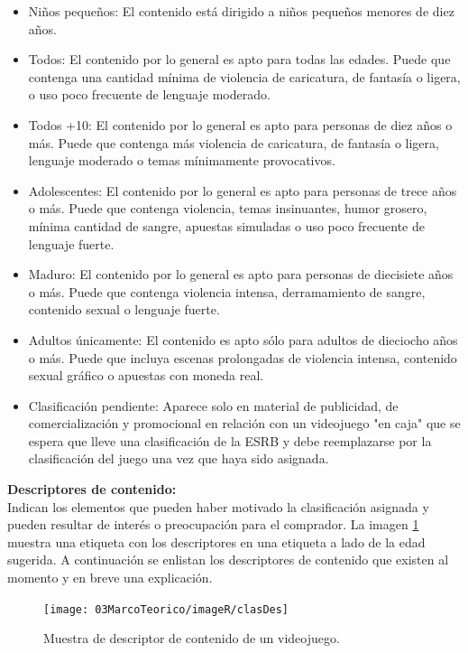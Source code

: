 			\begin{itemize}
			\item Niños pequeños: 
			El contenido está dirigido a niños pequeños menores de diez años.
			
			\item Todos: 
			El contenido por lo general es apto para todas las edades. Puede que contenga una cantidad mínima de violencia de caricatura, de fantasía o ligera, o uso poco frecuente de lenguaje moderado.
			
			\item Todos +10: 
			El contenido por lo general es apto para personas de diez años o más. Puede que contenga más violencia de caricatura, de fantasía o ligera, lenguaje moderado o temas mínimamente provocativos.
			
			\item Adolescentes: 
			El contenido por lo general es apto para personas de trece años o más. Puede que contenga violencia, temas insinuantes, humor grosero, mínima cantidad de sangre, apuestas simuladas o uso poco frecuente de lenguaje fuerte.
			
			\item Maduro: 
			El contenido por lo general es apto para personas de diecisiete años o más. Puede que contenga violencia intensa, derramamiento de sangre, contenido sexual o lenguaje fuerte.
			
			\item Adultos únicamente: 
			El contenido es apto sólo para adultos de dieciocho años o más. Puede que incluya escenas prolongadas de violencia intensa, contenido sexual gráfico o apuestas con moneda real.
			
			\item Clasificación pendiente: 
			Aparece solo en material de publicidad, de comercialización y promocional en relación con un videojuego "en caja" que se espera que lleve una clasificación de la ESRB y debe reemplazarse por la clasificación del juego una vez que haya sido asignada.
			
		\end{itemize}		
			
			\textbf{Descriptores de contenido: } 
			\\[1pt]
			Indican los elementos que pueden haber motivado la clasificación asignada y pueden resultar de interés o preocupación para el comprador. La imagen \ref{fig:clasDes} muestra una etiqueta con los descriptores en una etiqueta a lado de la edad sugerida. A continuación se enlistan los descriptores de contenido que existen al momento y en breve una explicación. 
			\\[1pt]
				\begin{figure}
				\centering
				\texttt{[image: 03MarcoTeorico/imageR/clasDes]}
				\caption{Muestra de descriptor de contenido de un videojuego.}
				\label{fig:clasDes}
			\end{figure}
			
